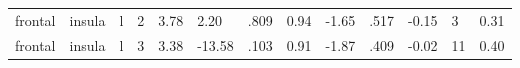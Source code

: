 \documentclass{article}
\begin{document}
\begin{longtable}{llrR{1.3cm}R{1cm}R{1.3cm}R{1cm}R{1cm}R{1.3cm}R{1cm}R{1.8cm}R{1.3cm}R{1.8cm}}
   frontal &                    insula &    l &         2 &                  3.78 &             2.20 &               .809 &                               0.94 &                         -1.65 &                            .517 &  -0.15 &      3 &      0.31 \\
   frontal &                    insula &    l &         3 &                  3.38 &           -13.58 &               .103 &                               0.91 &                         -1.87 &                            .409 &  -0.02 &     11 &      0.40 \\
\end{longtable}
\end{document}
